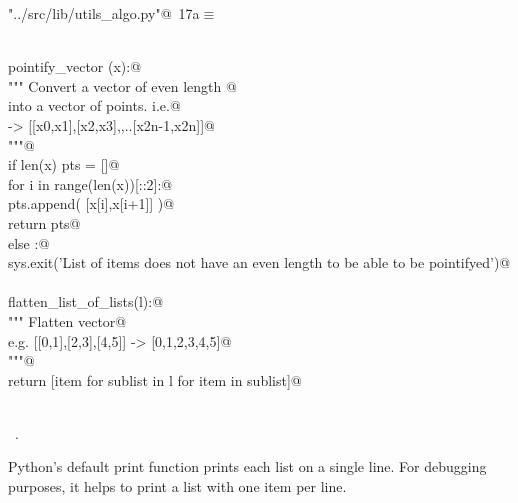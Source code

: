 \documentclass[11.5pt]{report}
\begin{document}
\begin{flushleft} \small\label{scrap8}\raggedright\small
{} \verb@"../src/lib/utils_algo.py"@\nobreak\ {\footnotesize {17a}}$\equiv$
\vspace{-1ex}
\begin{list}{}{} \item
\mbox{}\verb@@\\
\mbox{}\verb@def pointify_vector (x):@\\
\mbox{}\verb@    """ Convert a vector of even length @\\
\mbox{}\verb@    into a vector of points. i.e.@\\
\mbox{}\verb@    [x0,x1,x2,...x2n] -> [[x0,x1],[x2,x3],,..[x2n-1,x2n]]@\\
\mbox{}\verb@    """@\\
\mbox{}\verb@    if len(x) % 2 == 0:@\\
\mbox{}\verb@        pts = []@\\
\mbox{}\verb@        for i in range(len(x))[::2]:@\\
\mbox{}\verb@            pts.append( [x[i],x[i+1]] )@\\
\mbox{}\verb@        return pts@\\
\mbox{}\verb@    else :@\\
\mbox{}\verb@        sys.exit('List of items does not have an even length to be able to be pointifyed')@\\
\mbox{}\verb@@\\
\mbox{}\verb@def flatten_list_of_lists(l):@\\
\mbox{}\verb@    """ Flatten vector@\\
\mbox{}\verb@      e.g.  [[0,1],[2,3],[4,5]] -> [0,1,2,3,4,5]@\\
\mbox{}\verb@    """@\\
\mbox{}\verb@    return [item for sublist in l for item in sublist]@\\
\mbox{}\verb@@\\
\mbox{}\verb@@{\NWsep}
\end{list}
\vspace{-1.5ex}
\footnotesize
\begin{list}{}{\setlength{\itemsep}{-\parsep}\setlength{\itemindent}{-\leftmargin}}
\item \NWtxtFileDefBy\ .

\item{}
\end{list}
\vspace{4ex}
\end{flushleft}
\newchunk Python's default print function prints each list on a single line. For 
debugging purposes,  it helps to print a list with one item per line. 
\end{document}
